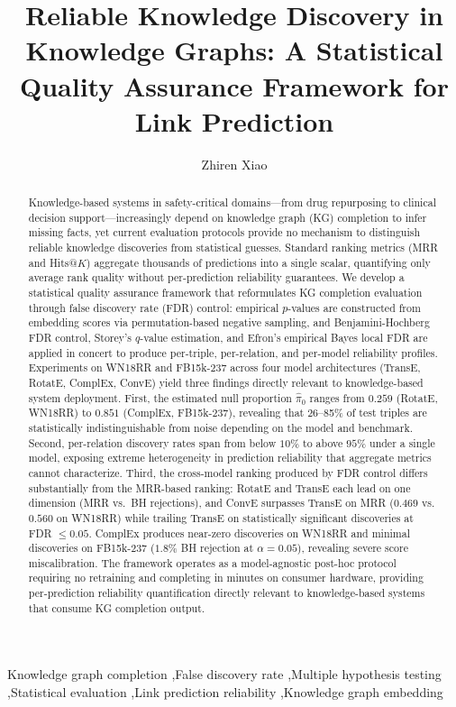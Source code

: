 \documentclass[review]{elsarticle}
\begin{document}
\begin{frontmatter}

\title{Reliable Knowledge Discovery in Knowledge Graphs: A Statistical Quality Assurance Framework for Link Prediction}

\author[1]{Zhiren Xiao}
\address[1]{Guangdong University of Finance, Guangzhou, China}%

\begin{abstract}
Knowledge-based systems in safety-critical domains---from drug repurposing to clinical decision support---increasingly depend on knowledge graph (KG) completion to infer missing facts, yet current evaluation protocols provide no mechanism to distinguish reliable knowledge discoveries from statistical guesses. Standard ranking metrics (MRR and Hits@$K$) aggregate thousands of predictions into a single scalar, quantifying only average rank quality without per-prediction reliability guarantees.
We develop a statistical quality assurance framework that reformulates KG completion evaluation through false discovery rate (FDR) control: empirical $p$-values are constructed from embedding scores via permutation-based negative sampling, and Benjamini-Hochberg FDR control, Storey's $q$-value estimation, and Efron's empirical Bayes local FDR are applied in concert to produce per-triple, per-relation, and per-model reliability profiles.
Experiments on WN18RR and FB15k-237 across four model architectures (TransE, RotatE, ComplEx, ConvE) yield three findings directly relevant to knowledge-based system deployment.
First, the estimated null proportion $\hat{\pi}_0$ ranges from $0.259$ (RotatE, WN18RR) to $0.851$ (ComplEx, FB15k-237), revealing that 26--85\% of test triples are statistically indistinguishable from noise depending on the model and benchmark.
Second, per-relation discovery rates span from below $10\%$ to above $95\%$ under a single model, exposing extreme heterogeneity in prediction reliability that aggregate metrics cannot characterize.
Third, the cross-model ranking produced by FDR control differs substantially from the MRR-based ranking: RotatE and TransE each lead on one dimension (MRR vs.\ BH rejections), and ConvE surpasses TransE on MRR ($0.469$ vs.\ $0.560$ on WN18RR) while trailing TransE on statistically significant discoveries at FDR $\leq 0.05$.
ComplEx produces near-zero discoveries on WN18RR and minimal discoveries on FB15k-237 ($1.8\%$ BH rejection at $\alpha = 0.05$), revealing severe score miscalibration.
The framework operates as a model-agnostic post-hoc protocol requiring no retraining and completing in minutes on consumer hardware, providing per-prediction reliability quantification directly relevant to knowledge-based systems that consume KG completion output.
\end{abstract}

\begin{keyword}
Knowledge graph completion \sep False discovery rate \sep Multiple hypothesis testing \sep Statistical evaluation \sep Link prediction reliability \sep Knowledge graph embedding
\end{keyword}

\end{frontmatter}
\end{document}
